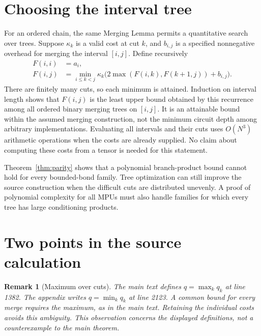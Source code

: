 \documentclass[11pt]{article}
\newtheorem{remark}[theorem]{Remark}
\begin{document}
\section{Choosing the interval tree}

For an ordered chain, the same Merging Lemma permits a quantitative search
over trees. Suppose $\kappa_k$ is a valid cost at cut $k$, and $b_{i,j}$
is a specified nonnegative overhead for merging the interval $[i,j]$.
Define recursively
\begin{align}
 F(i,i)&=a_i,\\
 F(i,j)&=\min_{i\leq k<j}\kappa_k
     \bigl(2\max(F(i,k),F(k+1,j))+b_{i,j}\bigr).
 \label{eq:interval-minimum}
\end{align}
There are finitely many cuts, so each minimum is attained. Induction on
interval length shows that $F(i,j)$ is the least upper bound obtained by
this recurrence among all ordered binary merging trees on $[i,j]$.
It is an attainable bound within the assumed merging construction, not the
minimum circuit depth among arbitrary implementations. Evaluating all
intervals and their cuts uses $O(N^3)$ arithmetic operations when the costs
are already supplied. No claim about computing these costs from a tensor
is needed for this statement.

Theorem~\ref{thm:parity} shows that a polynomial branch-product bound cannot
hold for every bounded-bond family. Tree optimization can still improve
the source construction when the difficult cuts are distributed unevenly.
A proof of polynomial complexity for all MPUs must also handle families
for which every tree has large conditioning products.

\section{Two points in the source calculation}

\begin{remark}[Maximum over cuts]
The main text defines $q=\max_kq_k$ at line 1382. The appendix writes
$q=\min_kq_k$ at line 2123. A common bound for every merge requires the
maximum, as in the main text. Retaining the individual costs avoids this
ambiguity. This observation concerns the displayed definitions, not a
counterexample to the main theorem.
\end{remark}
\end{document}
